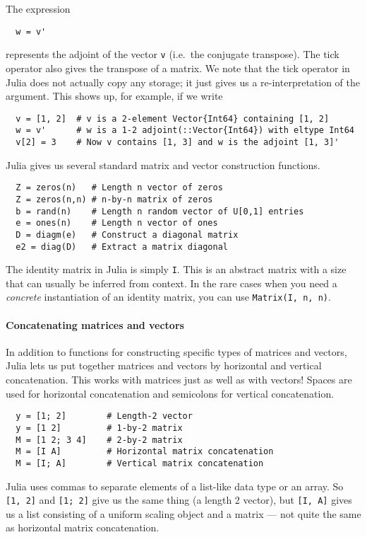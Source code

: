 \documentclass[12pt, leqno]{article}
\begin{document}
The expression
\begin{lstlisting}
  w = v'
\end{lstlisting}
represents the adjoint of the vector {\tt v} (i.e.~the conjugate
transpose).  The tick operator also gives the transpose of a matrix.
We note that the tick operator in Julia does not actually copy any
storage; it just gives us a re-interpretation of the argument.  This
shows up, for example, if we write
\begin{lstlisting}
  v = [1, 2]  # v is a 2-element Vector{Int64} containing [1, 2]
  w = v'      # w is a 1-2 adjoint(::Vector{Int64}) with eltype Int64
  v[2] = 3    # Now v contains [1, 3] and w is the adjoint [1, 3]'
\end{lstlisting}

Julia gives us several standard matrix and vector construction functions.
\begin{lstlisting}
  Z = zeros(n)   # Length n vector of zeros
  Z = zeros(n,n) # n-by-n matrix of zeros
  b = rand(n)    # Length n random vector of U[0,1] entries
  e = ones(n)    # Length n vector of ones
  D = diagm(e)   # Construct a diagonal matrix
  e2 = diag(D)   # Extract a matrix diagonal
\end{lstlisting}
The identity matrix in Julia is simply {\tt I}.  This is an abstract
matrix with a size that can usually be inferred from context.  In the
rare cases when you need a {\em concrete} instantiation of an identity
matrix, you can use {\tt Matrix(I, n, n)}.

\paragraph{Concatenating matrices and vectors}
In addition to functions for constructing specific types of matrices
and vectors, Julia lets us put together matrices and vectors by
horizontal and vertical concatenation.  This works with
matrices just as well as with vectors!  Spaces are used for horizontal
concatenation and semicolons for vertical concatenation.
\begin{lstlisting}
  y = [1; 2]        # Length-2 vector
  y = [1 2]         # 1-by-2 matrix
  M = [1 2; 3 4]    # 2-by-2 matrix
  M = [I A]         # Horizontal matrix concatenation
  M = [I; A]        # Vertical matrix concatenation
\end{lstlisting}
Julia uses commas to separate elements of a list-like data type or an
array.  So {\tt [1, 2]} and {\tt [1; 2]} give us the same thing (a
length 2 vector), but {\tt [I, A]} gives us a list consisting of a
uniform scaling object and a matrix --- not quite the same as horizontal
matrix concatenation.
\end{document}

